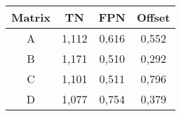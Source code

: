 \documentclass[a4papper, 11pt]{article}
\begin{document}
\begin{itemize}
            \begin{center}
              \begin{tabular}{|c|c|c|c|}
                \hline %
       \rowcolor{light-gray}           Matrix  &  TN   &  FPN  &  Offset  \tabularnewline
                \hline %
                    A     & 1,112 & 0,616 & 0,552    \tabularnewline
                \hline %
                    B     & 1,171 & 0,510 & 0,292    \tabularnewline
                \hline %
                    C     & 1,101 & 0,511 & 0,796    \tabularnewline
                \hline %
                    D     & 1,077 & 0,754 & 0,379    \tabularnewline
                \hline %
              \end{tabular}
            \end{center}
        \end{itemize}
\end{document}
